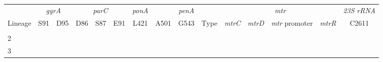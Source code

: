 \begingroup
\fontsize{5.2pt}{6.3pt}\selectfont
\begin{longtable}{l|cccccccccccccc}
\toprule
 & \multicolumn{2}{c}{\emph{gyrA}} & \multicolumn{3}{c}{\emph{parC}} & \emph{ponA} & \multicolumn{3}{c}{\emph{penA}} & \multicolumn{4}{c}{\emph{mtr}} & \emph{23S rRNA} \\ 
\cmidrule(lr){2-3} \cmidrule(lr){4-6} \cmidrule(lr){7-7} \cmidrule(lr){8-10} \cmidrule(lr){11-14} \cmidrule(lr){15-15}
Lineage & S91 & D95 & D86 & S87 & E91 & L421 & A501 & G543 & Type & \emph{mtrC} & \emph{mtrD} & \emph{mtr} promoter & \emph{mtrR} & C2611 \\ 
\midrule\addlinespace[2.5pt]
1 & {\cellcolor[HTML]{808080}{\textcolor[HTML]{FFFFFF}{S}}} & {\cellcolor[HTML]{808080}{\textcolor[HTML]{FFFFFF}{D}}} & {\cellcolor[HTML]{808080}{\textcolor[HTML]{FFFFFF}{D}}} & {\cellcolor[HTML]{808080}{\textcolor[HTML]{FFFFFF}{S}}} & {\cellcolor[HTML]{808080}{\textcolor[HTML]{FFFFFF}{E}}} & {\cellcolor[HTML]{808080}{\textcolor[HTML]{FFFFFF}{L}}} & {\cellcolor[HTML]{808080}{\textcolor[HTML]{FFFFFF}{A}}} & {\cellcolor[HTML]{808080}{\textcolor[HTML]{FFFFFF}{G}}} & {\cellcolor[HTML]{808080}{\textcolor[HTML]{FFFFFF}{non-m}}} & {\cellcolor[HTML]{808080}{\textcolor[HTML]{FFFFFF}{non-m}}} & {\cellcolor[HTML]{808080}{\textcolor[HTML]{FFFFFF}{non-m}}} & {\cellcolor[HTML]{808080}{\textcolor[HTML]{FFFFFF}{non-m}}} & {\cellcolor[HTML]{A6CEE3}{\textcolor[HTML]{000000}{LOF}}} & {\cellcolor[HTML]{808080}{\textcolor[HTML]{FFFFFF}{C}}} \\ 
2 & {\cellcolor[HTML]{808080}{\textcolor[HTML]{FFFFFF}{S}}} & {\cellcolor[HTML]{808080}{\textcolor[HTML]{FFFFFF}{D}}} & {\cellcolor[HTML]{808080}{\textcolor[HTML]{FFFFFF}{D}}} & {\cellcolor[HTML]{808080}{\textcolor[HTML]{FFFFFF}{S}}} & {\cellcolor[HTML]{808080}{\textcolor[HTML]{FFFFFF}{E}}} & {\cellcolor[HTML]{808080}{\textcolor[HTML]{FFFFFF}{L}}} & {\cellcolor[HTML]{808080}{\textcolor[HTML]{FFFFFF}{A}}} & {\cellcolor[HTML]{808080}{\textcolor[HTML]{FFFFFF}{G}}} & {\cellcolor[HTML]{808080}{\textcolor[HTML]{FFFFFF}{non-m}}} & {\cellcolor[HTML]{808080}{\textcolor[HTML]{FFFFFF}{non-m}}} & {\cellcolor[HTML]{808080}{\textcolor[HTML]{FFFFFF}{non-m}}} & {\cellcolor[HTML]{808080}{\textcolor[HTML]{FFFFFF}{non-m}}} & {\cellcolor[HTML]{808080}{\textcolor[HTML]{FFFFFF}{non-m}}} & {\cellcolor[HTML]{808080}{\textcolor[HTML]{FFFFFF}{C}}} \\ 
3 & {\cellcolor[HTML]{808080}{\textcolor[HTML]{FFFFFF}{S}}} & {\cellcolor[HTML]{808080}{\textcolor[HTML]{FFFFFF}{D}}} & {\cellcolor[HTML]{808080}{\textcolor[HTML]{FFFFFF}{D}}} & {\cellcolor[HTML]{808080}{\textcolor[HTML]{FFFFFF}{S}}} & {\cellcolor[HTML]{808080}{\textcolor[HTML]{FFFFFF}{E}}} & {\cellcolor[HTML]{808080}{\textcolor[HTML]{FFFFFF}{L}}} & {\cellcolor[HTML]{808080}{\textcolor[HTML]{FFFFFF}{A}}} & {\cellcolor[HTML]{808080}{\textcolor[HTML]{FFFFFF}{G}}} & {\cellcolor[HTML]{808080}{\textcolor[HTML]{FFFFFF}{non-m}}} & {\cellcolor[HTML]{808080}{\textcolor[HTML]{FFFFFF}{non-m}}} & {\cellcolor[HTML]{808080}{\textcolor[HTML]{FFFFFF}{non-m}}} & {\cellcolor[HTML]{808080}{\textcolor[HTML]{FFFFFF}{non-m}}} & {\cellcolor[HTML]{808080}{\textcolor[HTML]{FFFFFF}{non-m}}} & {\cellcolor[HTML]{808080}{\textcolor[HTML]{FFFFFF}{C}}} \\ 

\end{longtable}
